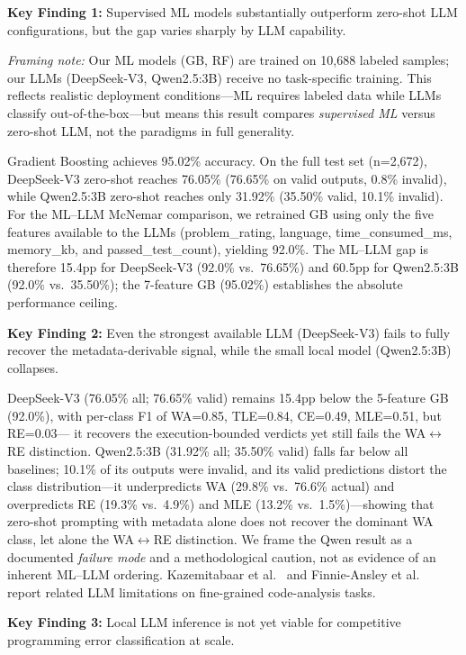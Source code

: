 \documentclass[acmsmall]{acmart}
\begin{document}
\textbf{Key Finding 1:} Supervised ML models substantially outperform
zero-shot LLM configurations, but the gap varies sharply by LLM capability.

\textit{Framing note:} Our ML models (GB, RF) are trained on 10,688 labeled
samples; our LLMs (DeepSeek-V3, Qwen2.5:3B) receive no task-specific training.
This reflects realistic deployment conditions---ML requires labeled data while LLMs
classify out-of-the-box---but means this result compares \emph{supervised ML} versus
zero-shot LLM, not the paradigms in full generality.

Gradient Boosting achieves 95.02\% accuracy. On the full test set
(n=2,672), DeepSeek-V3 zero-shot reaches 76.05\% (76.65\% on valid outputs,
0.8\% invalid), while Qwen2.5:3B zero-shot reaches only 31.92\%
(35.50\% valid, 10.1\% invalid). For the ML--LLM McNemar comparison, we
retrained GB using only the five features available to the LLMs
(problem\_rating, language, time\_consumed\_ms, memory\_kb, and
passed\_test\_count), yielding 92.0\%. The ML--LLM gap is therefore
15.4pp for DeepSeek-V3 (92.0\% vs.\ 76.65\%) and 60.5pp for Qwen2.5:3B
(92.0\% vs.\ 35.50\%); the 7-feature GB (95.02\%) establishes the
absolute performance ceiling.

\textbf{Key Finding 2:} Even the strongest available LLM (DeepSeek-V3) fails
to fully recover the metadata-derivable signal, while the small local model
(Qwen2.5:3B) collapses.

DeepSeek-V3 (76.05\% all; 76.65\% valid) remains 15.4pp below the 5-feature GB (92.0\%),
with per-class F1 of WA=0.85, TLE=0.84, CE=0.49, MLE=0.51, but RE=0.03---
it recovers the execution-bounded verdicts yet still fails the WA$\leftrightarrow$RE
distinction. Qwen2.5:3B (31.92\% all; 35.50\% valid) falls far below all
baselines; 10.1\% of its outputs were invalid, and its valid predictions
distort the class distribution---it underpredicts WA (29.8\% vs.\ 76.6\% actual)
and overpredicts RE (19.3\% vs.\ 4.9\%) and MLE (13.2\% vs.\ 1.5\%)---showing
that zero-shot prompting with metadata alone does not recover the dominant
WA class, let alone the WA$\leftrightarrow$RE distinction. We frame the Qwen
result as a documented \emph{failure mode} and a methodological caution, not as
evidence of an inherent ML--LLM ordering. Kazemitabaar et al.~\cite{kazemitabaar2024impact}
and Finnie-Ansley et al.~\cite{finnie2022robots} report related LLM
limitations on fine-grained code-analysis tasks.

\textbf{Key Finding 3:} Local LLM inference is not yet viable for competitive
programming error classification at scale.
\end{document}
